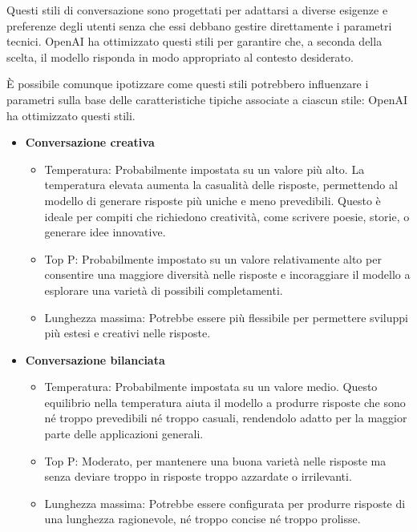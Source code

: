         Questi stili di conversazione sono progettati per adattarsi a diverse esigenze e preferenze degli utenti senza che essi debbano gestire direttamente i parametri tecnici. OpenAI ha ottimizzato questi stili per garantire che, a seconda della scelta, il modello risponda in modo appropriato al contesto desiderato.

        È possibile comunque ipotizzare come questi stili potrebbero influenzare i parametri sulla base delle caratteristiche tipiche associate a ciascun stile: OpenAI ha ottimizzato questi stili.

        \begin{itemize}
            \item \textbf{Conversazione creativa}
            \begin{itemize}
                \item Temperatura: Probabilmente impostata su un valore più alto. La temperatura elevata aumenta la casualità delle risposte, permettendo al modello di generare risposte più uniche e meno prevedibili. Questo è ideale per compiti che richiedono creatività, come scrivere poesie, storie, o generare idee innovative.
                \item Top P: Probabilmente impostato su un valore relativamente alto per consentire una maggiore diversità nelle risposte e incoraggiare il modello a esplorare una varietà di possibili completamenti.
                \item Lunghezza massima: Potrebbe essere più flessibile per permettere sviluppi più estesi e creativi nelle risposte.
            \end{itemize}
            
            \item \textbf{Conversazione bilanciata}
            \begin{itemize}
                \item Temperatura: Probabilmente impostata su un valore medio. Questo equilibrio nella temperatura aiuta il modello a produrre risposte che sono né troppo prevedibili né troppo casuali, rendendolo adatto per la maggior parte delle applicazioni generali.
                \item Top P: Moderato, per mantenere una buona varietà nelle risposte ma senza deviare troppo in risposte troppo azzardate o irrilevanti.
                \item Lunghezza massima: Potrebbe essere configurata per produrre risposte di una lunghezza ragionevole, né troppo concise né troppo prolisse.
            \end{itemize}
            

\end{itemize}
